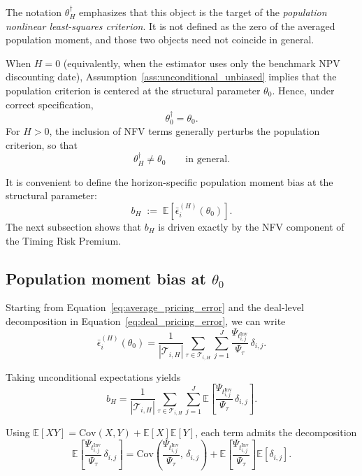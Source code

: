 The notation $\theta_H^\dagger$ emphasizes that this object is the target of the \emph{population nonlinear least-squares criterion}.
It is not defined as the zero of the averaged population moment, and those two objects need not coincide in general.

When $H=0$ (equivalently, when the estimator uses only the benchmark NPV discounting date), Assumption~\ref{ass:unconditional_unbiased} implies that the population criterion is centered at the structural parameter $\theta_0$.
Hence, under correct specification,
\[
\theta_0^\dagger = \theta_0.
\]
For $H>0$, the inclusion of NFV terms generally perturbs the population criterion, so that
\[
\theta_H^\dagger \neq \theta_0
\qquad\text{in general.}
\]

It is convenient to define the horizon-specific population moment bias at the structural parameter:
\begin{equation}
	\label{eq:bH_def_blueprint}
	b_H
	\;:=\;
	\mathbb{E}\!\left[
	\bar{\epsilon}_i^{(H)}(\theta_0)
	\right].
\end{equation}
The next subsection shows that $b_H$ is driven exactly by the NFV component of the Timing Risk Premium.

\subsection{Population moment bias at $\theta_0$}
\label{sec:appendix_bv_moment_bias}

Starting from Equation~\ref{eq:average_pricing_error} and the deal-level decomposition in Equation~\ref{eq:deal_pricing_error}, we can write
\begin{equation}
	\label{eq:avg_eps_expand_blueprint}
	\bar{\epsilon}_i^{(H)}(\theta_0)
	=
	\frac{1}{|\mathcal{T}_{i,H}|}
	\sum_{\tau \in \mathcal{T}_{i,H}}
	\sum_{j=1}^{J}
	\frac{\Psi_{t_{i,j}^{\mathrm{Inv}}}}{\Psi_\tau}\,
	\delta_{i,j}.
\end{equation}

Taking unconditional expectations yields
\begin{equation}
	\label{eq:avg_eps_expectation_blueprint}
	b_H
	=
	\frac{1}{|\mathcal{T}_{i,H}|}
	\sum_{\tau \in \mathcal{T}_{i,H}}
	\sum_{j=1}^{J}
	\mathbb{E}\!\left[
	\frac{\Psi_{t_{i,j}^{\mathrm{Inv}}}}{\Psi_\tau}\,
	\delta_{i,j}
	\right].
\end{equation}

Using $\mathbb{E}[XY] = \mathrm{Cov}(X,Y) + \mathbb{E}[X]\mathbb{E}[Y]$, each term admits the decomposition
\begin{equation}
	\label{eq:cov_decomp_blueprint}
	\mathbb{E}\!\left[
	\frac{\Psi_{t_{i,j}^{\mathrm{Inv}}}}{\Psi_\tau}\,
	\delta_{i,j}
	\right]
	=
	\mathrm{Cov}\!\left(
	\frac{\Psi_{t_{i,j}^{\mathrm{Inv}}}}{\Psi_\tau},\,
	\delta_{i,j}
	\right)
	+
	\mathbb{E}\!\left[
	\frac{\Psi_{t_{i,j}^{\mathrm{Inv}}}}{\Psi_\tau}
	\right]
	\mathbb{E}[\delta_{i,j}].
\end{equation}


